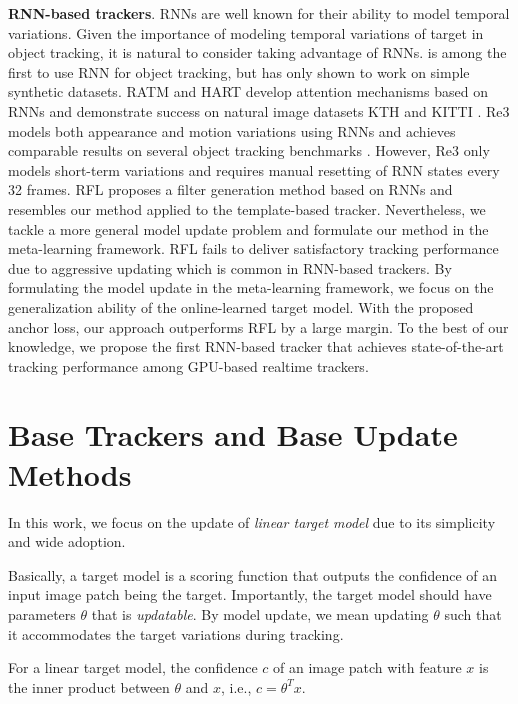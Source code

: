\documentclass[journal]{IEEEtran}
\begin{document}
\textbf{RNN-based trackers}.
RNNs are well known for their ability to model temporal variations. Given the importance of modeling temporal variations of target in object tracking, it is natural to consider taking advantage of RNNs. \cite{gan2015first} is among the first to use RNN for object tracking, but has only shown to work on simple synthetic datasets. RATM \cite{kahou2015ratm} and HART \cite{Kosiorek2017HierarchicalAR} develop attention mechanisms based on RNNs and demonstrate success on natural image datasets KTH \cite{Schldt2004RecognizingHA} and KITTI \cite{Geiger2013VisionMR}. Re3 \cite{gordon2017re3} models both appearance and motion variations using RNNs and achieves comparable results on several object tracking benchmarks \cite{Kristan2014TheVO, Kristan2016TheVO, wu2013online}. However, Re3 \cite{gordon2017re3} only models short-term variations and requires manual resetting of RNN states every 32 frames. RFL \cite{yang2017recurrent} proposes a filter generation method based on RNNs and resembles our method applied to the template-based tracker. Nevertheless, we tackle a more general model update problem and formulate our method in the meta-learning framework. RFL fails to deliver satisfactory tracking performance due to aggressive updating which is common in RNN-based trackers. By formulating the model update in the meta-learning framework, we focus on the generalization ability of the online-learned target model. With the proposed anchor loss, our approach outperforms RFL by a large margin. To the best of our knowledge, we propose the first RNN-based tracker that achieves state-of-the-art tracking performance among GPU-based realtime trackers.

\section{Base Trackers and Base Update Methods} \label{sec:base-tracker-base-update-method}
In this work, we focus on the update of \emph{linear target model} due to its simplicity and wide adoption.  

Basically, a target model is a scoring function that outputs the confidence of an input image patch being the target. Importantly, the target model should have parameters $\theta$ that is \emph{updatable}. By model update, we mean updating $\theta$ such that it accommodates the target variations during tracking.
 
For a linear target model, the confidence $c$ of an image patch with feature $x$ is the inner product between $\theta$ and $x$, i.e., $c = \theta^T x$.
\end{document}
